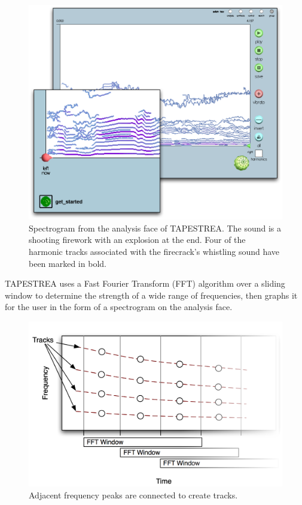 \documentclass{article}
\begin{document}
\begin{figure}
\includegraphics[scale=0.09]{images/group-focused}

\caption{\label{fig:spectrogram}Spectrogram from the analysis face of
TAPESTREA.  The sound is a shooting firework with an explosion at the end. Four
of the harmonic tracks associated with the firecrack's whistling sound have
been marked in bold.}
\end{figure}

TAPESTREA uses a Fast Fourier Transform (FFT) algorithm over a sliding window
to determine the strength of a wide range of frequencies, then graphs it for
the user in the form of a spectrogram on the analysis face.

\begin{figure}
\includegraphics[scale=0.5]{images/trackdots}

\caption{\label{fig:trackdots}Adjacent frequency peaks are connected to create
tracks.}
\end{figure}
\end{document}

